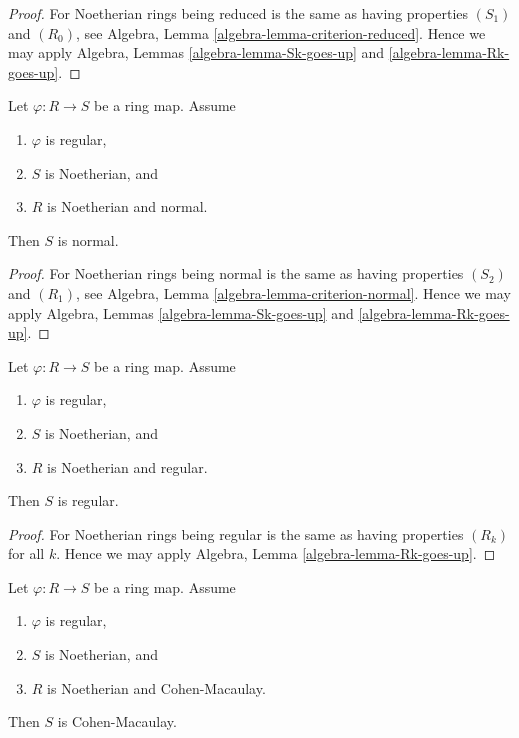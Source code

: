 \begin{proof}
For Noetherian rings being reduced is the same as having properties
$(S_1)$ and $(R_0)$, see
Algebra, Lemma \ref{algebra-lemma-criterion-reduced}.
Hence we may apply
Algebra, Lemmas \ref{algebra-lemma-Sk-goes-up} and
\ref{algebra-lemma-Rk-goes-up}.
\end{proof}

\begin{lemma}
\label{lemma-normal-goes-up}
Let $\varphi : R \to S$ be a ring map. Assume
\begin{enumerate}
\item $\varphi$ is regular,
\item $S$ is Noetherian, and
\item $R$ is Noetherian and normal.
\end{enumerate}
Then $S$ is normal.
\end{lemma}

\begin{proof}
For Noetherian rings being normal is the same as having properties
$(S_2)$ and $(R_1)$, see
Algebra, Lemma \ref{algebra-lemma-criterion-normal}.
Hence we may apply
Algebra, Lemmas \ref{algebra-lemma-Sk-goes-up} and
\ref{algebra-lemma-Rk-goes-up}.
\end{proof}

\begin{lemma}
\label{lemma-regular-goes-up}
Let $\varphi : R \to S$ be a ring map. Assume
\begin{enumerate}
\item $\varphi$ is regular,
\item $S$ is Noetherian, and
\item $R$ is Noetherian and regular.
\end{enumerate}
Then $S$ is regular.
\end{lemma}

\begin{proof}
For Noetherian rings being regular is the same as having properties
$(R_k)$ for all $k$. Hence we may apply
Algebra, Lemma \ref{algebra-lemma-Rk-goes-up}.
\end{proof}

\begin{lemma}
\label{lemma-CM-goes-up}
Let $\varphi : R \to S$ be a ring map. Assume
\begin{enumerate}
\item $\varphi$ is regular,
\item $S$ is Noetherian, and
\item $R$ is Noetherian and Cohen-Macaulay.
\end{enumerate}
Then $S$ is Cohen-Macaulay.
\end{lemma}

